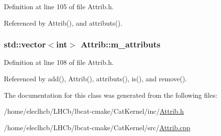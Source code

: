 Definition at line 105 of file Attrib.h.

Referenced by Attrib(), and attributs().\hypertarget{classAttrib_ac4bd58a0cc6b38a3b711d609a3d3aacc}{
\subsubsection[{m\_\-attributs}]{\setlength{\rightskip}{0pt plus 5cm}std::vector$<$int$>$ {\bf Attrib::m\_\-attributs}}}
\label{classAttrib_ac4bd58a0cc6b38a3b711d609a3d3aacc}


Definition at line 108 of file Attrib.h.

Referenced by add(), Attrib(), attributs(), is(), and remove().

The documentation for this class was generated from the following files:\begin{DoxyCompactItemize}
\item 
/home/eleclhcb/LHCb/lbcat-\/cmake/CatKernel/inc/\hyperlink{Attrib_8h}{Attrib.h}\item 
/home/eleclhcb/LHCb/lbcat-\/cmake/CatKernel/src/\hyperlink{Attrib_8cpp}{Attrib.cpp}\end{DoxyCompactItemize}
